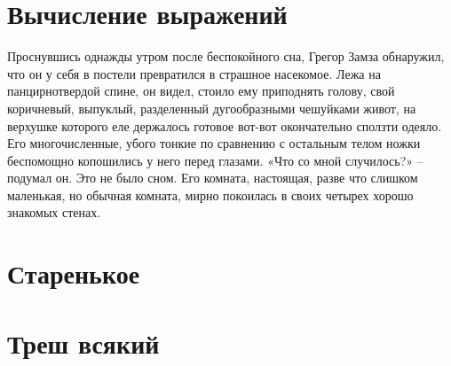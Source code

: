 \chapter{Вычисление выражений}

Проснувшись однажды утром после беспокойного сна, Грегор Замза обнаружил, что
он у себя в постели превратился в страшное насекомое. Лежа на панцирнотвердой
спине, он видел, стоило ему приподнять голову, свой коричневый, выпуклый,
разделенный дугообразными чешуйками живот, на верхушке которого еле держалось
готовое вот-вот окончательно сползти одеяло. Его многочисленные, убого тонкие
по сравнению с остальным телом ножки беспомощно копошились у него перед
глазами. «Что со мной случилось?» – подумал он. Это не было сном. Его комната,
настоящая, разве что слишком маленькая, но обычная комната, мирно покоилась в
своих четырех хорошо знакомых стенах.








\chapter{Старенькое}








\chapter{Треш всякий}





